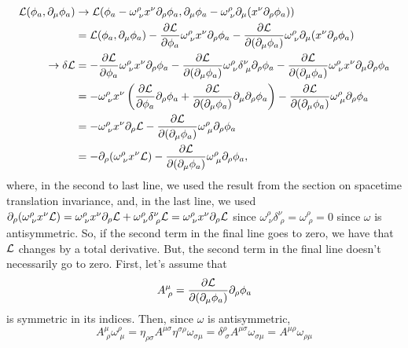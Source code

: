 \begin{align*}
    \mathcal{L}(\phi_a, \partial_\mu\phi_a)&\rightarrow \mathcal{L}(\phi_a - \omega^\rho_{\;\nu}x^\nu\partial_\rho\phi_a, \partial_\mu\phi_a-\omega^\rho_{\;\nu}\partial_\mu (x^\nu\partial_\rho\phi_a))\\
    & = \mathcal{L}(\phi_a, \partial_\mu\phi_a) - \frac{\partial\mathcal{L}}{\partial\phi_a}\omega^\rho_{\;\nu}x^\nu\partial_\rho\phi_a-\frac{\partial\mathcal{L}}{\partial(\partial_\mu\phi_a)}\omega^\rho_{\;\nu}\partial_\mu(x^\nu\partial_\rho\phi_a) \\
    \rightarrow\delta\mathcal{L}&= - \frac{\partial\mathcal{L}}{\partial\phi_a}\omega^\rho_{\;\nu}x^\nu\partial_\rho\phi_a-\frac{\partial\mathcal{L}}{\partial(\partial_\mu\phi_a)}\omega^\rho_{\;\nu}\delta^\nu_{\;\mu}\partial_\rho\phi_a - \frac{\partial\mathcal{L}}{\partial(\partial_\mu\phi_a)}\omega^\rho_{\;\nu}x^\nu\partial_\mu\partial_\rho\phi_a\\
    &= -\omega^\rho_{\;\nu}x^\nu\left(\frac{\partial\mathcal{L}}{\partial\phi_a}\partial_\rho\phi_a+\frac{\partial\mathcal{L}}{\partial(\partial_\mu\phi_a)}\partial_\mu\partial_\rho\phi_a\right) - \frac{\partial\mathcal{L}}{\partial(\partial_\mu\phi_a)}\omega^\rho_{\;\mu}\partial_\rho\phi_a\\
    & = -\omega^{\rho}_{\;\nu}x^\nu\partial_\rho\mathcal{L} - \frac{\partial\mathcal{L}}{\partial(\partial_\mu\phi_a)}\omega^\rho_{\;\mu}\partial_\rho\phi_a\\
    & = -\partial_\rho(\omega^\rho_{\;\nu}x^\nu\mathcal{L})-\frac{\partial\mathcal{L}}{\partial(\partial_\mu\phi_a)}\omega^\rho_{\;\mu}\partial_\rho\phi_a,
\end{align*}
where, in the second to last line, we used the result from the section on spacetime translation invariance, and, in the last line, we used $\partial_\rho(\omega^\rho_{\;\nu}x^\nu\mathcal{L}) = \omega^\rho_{\;\nu}x^\nu\partial_\rho\mathcal{L} + \omega^{\rho}_{\;\nu}\delta^{\nu}_{\;\rho}\mathcal{L}=\omega^{\rho}_{\;\nu}x^\nu\partial_\rho\mathcal{L}$ since $\omega^{\rho}_{\;\nu}\delta^\nu_{\;\rho}=\omega^\rho_{\;\rho}=0$ since $\omega$ is antisymmetric. So, if the second term in the final line goes to zero, we have that $\mathcal{L}$ changes by a total derivative. But, the second term in the final line doesn't necessarily go to zero. First, let's assume that
\[
    A^\mu_{\;\rho}=\frac{\partial\mathcal{L}}{\partial(\partial_\mu\phi_a)}\partial_\rho\phi_a
\]
is symmetric in its indices. Then, since $\omega$ is antisymmetric, 
\[
    A^\mu_{\;\rho}\omega^\rho_{\;\mu} = \eta_{\rho\sigma}A^{\mu\sigma}\eta^{\sigma\rho}\omega_{\sigma\mu} = \delta^{\rho}_{\;\sigma} A^{\mu\sigma}\omega_{\sigma\mu}=A^{\mu\rho}\omega_{\rho\mu}
\]
